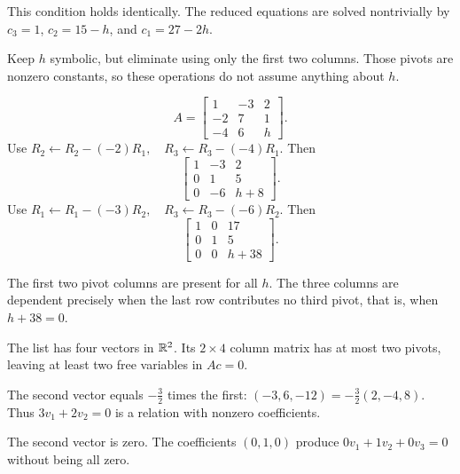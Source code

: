 This condition holds identically. The reduced equations are solved nontrivially by $c_3=1$, $c_2=15-h$, and $c_1=27-2h$.



\idea Keep $h$ symbolic, but eliminate using only the first two columns. Those pivots are nonzero constants, so these operations do not assume anything about $h$.

\[ A=\begin{bmatrix}1 & -3 & 2\\-2 & 7 & 1\\-4 & 6 & h\end{bmatrix}.\]
Use $R_{2}\leftarrow R_{2}-(-2)R_{1},\quad R_{3}\leftarrow R_{3}-(-4)R_{1}$. Then
\[ \begin{bmatrix}1 & -3 & 2\\0 & 1 & 5\\0 & -6 & h + 8\end{bmatrix}.\]
Use $R_{1}\leftarrow R_{1}-(-3)R_{2},\quad R_{3}\leftarrow R_{3}-(-6)R_{2}$. Then
\[ \begin{bmatrix}1 & 0 & 17\\0 & 1 & 5\\0 & 0 & h + 38\end{bmatrix}.\]

The first two pivot columns are present for all $h$. The three columns are dependent precisely when the last row contributes no third pivot, that is, when $h + 38=0$.



The list has four vectors in $\mathbb{R}^2$. Its $2\times4$ column matrix
has at most two pivots, leaving at least two free variables in $Ac=0$.

The second vector equals $-\tfrac32$ times the first:
$(-3,6,-12)=-\tfrac32(2,-4,8)$.
Thus $3v_1+2v_2=0$ is a relation with nonzero coefficients.

The second vector is zero. The coefficients $(0,1,0)$ produce
$0v_1+1v_2+0v_3=0$ without being all zero.

